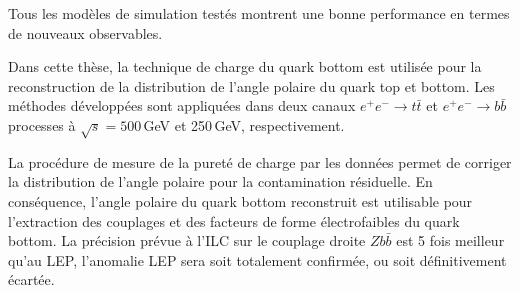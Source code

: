 Tous les modèles de simulation testés montrent une bonne performance en termes de nouveaux observables.

Dans cette thèse, la technique de charge du quark bottom est utilisée pour la reconstruction de la distribution de l'angle polaire du quark top et bottom.
Les méthodes développées sont appliquées dans deux canaux $e^+ e^- \to t\bar{t}$ et $e^+ e^- \to b\bar{b}$ processes à $\sqrt {s} = 500$\,GeV et 250\,GeV, respectivement.

La procédure de mesure de la pureté de charge par les données permet de corriger la distribution  de l'angle polaire pour la contamination résiduelle.
En conséquence, l'angle polaire du quark bottom reconstruit est utilisable pour l'extraction des couplages  et des facteurs de forme électrofaibles du quark bottom.
La précision prévue à l'ILC sur le couplage droite $Zb\bar{b}$ est 5 fois meilleur qu'au LEP, l'anomalie LEP sera soit totalement confirmée, ou soit définitivement écartée.


